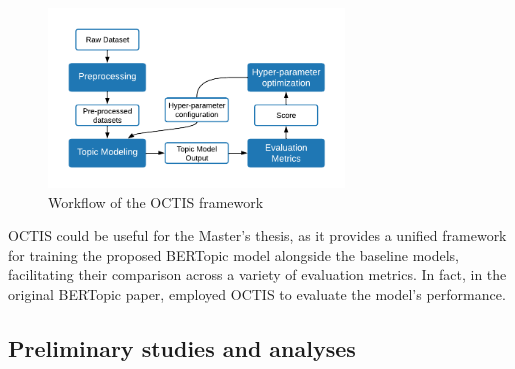 \documentclass{article}
\begin{document}
\begin{figure}[h] %
    \centering
    \includegraphics[width=0.7\textwidth]{images/octis.pdf}
    \caption{Workflow of the OCTIS framework \cite{terragni_octis_2021}}
    \label{fig:octis}
\end{figure}

OCTIS could be useful for the Master's thesis, as it provides a unified framework for training the proposed BERTopic model alongside the baseline models, facilitating their comparison across a variety of evaluation metrics. In fact, in the original BERTopic paper, \citet{grootendorst_bertopic_2022} employed OCTIS to evaluate the model's performance.






\subsection{Preliminary studies and analyses}

\end{document}
